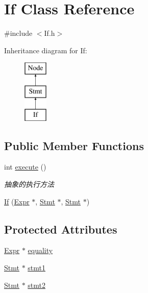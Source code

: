 \hypertarget{class_if}{}\section{If Class Reference}
\label{class_if}


{\ttfamily \#include $<$If.\+h$>$}

Inheritance diagram for If\+:\begin{figure}[H]
\begin{center}
\leavevmode
\includegraphics[height=3.000000cm]{class_if}
\end{center}
\end{figure}
\subsection*{Public Member Functions}
\begin{DoxyCompactItemize}
\item 
int \hyperlink{class_if_aeadf929258ccd07a239879c118fb152f}{execute} ()
\begin{DoxyCompactList}\small\item\em 抽象的执行方法 \end{DoxyCompactList}\item 
\hyperlink{class_if_a398387169436db838e9935b985a8f4a9}{If} (\hyperlink{class_expr}{Expr} $\ast$, \hyperlink{class_stmt}{Stmt} $\ast$, \hyperlink{class_stmt}{Stmt} $\ast$)
\end{DoxyCompactItemize}
\subsection*{Protected Attributes}
\begin{DoxyCompactItemize}
\item 
\hyperlink{class_expr}{Expr} $\ast$ \hyperlink{class_if_a84f2d73109cd8030fcc244ef741b5803}{equality}
\item 
\hyperlink{class_stmt}{Stmt} $\ast$ \hyperlink{class_if_a3ece7870e5d5b11dd42457e22af00a72}{stmt1}
\item 
\hyperlink{class_stmt}{Stmt} $\ast$ \hyperlink{class_if_aaf8a095b5a986832928ebdcdb263d41c}{stmt2}
\end{DoxyCompactItemize}
